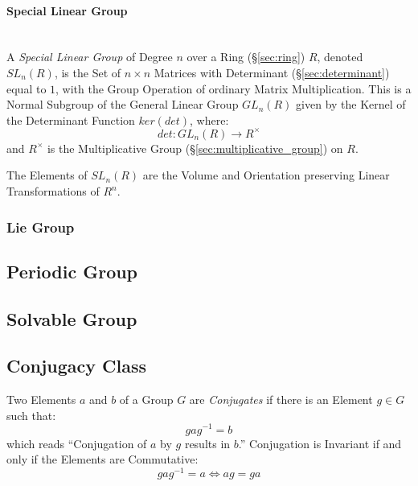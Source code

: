 \paragraph{Special Linear Group}\label{sec:special_linear_group}

\hfill \\ A \emph{Special Linear Group} of Degree $n$ over a Ring
(\S\ref{sec:ring}) $R$, denoted $SL_n(R)$, is the Set of $n \times n$
Matrices with Determinant (\S\ref{sec:determinant}) equal to $1$, with
the Group Operation of ordinary Matrix Multiplication. This is a
Normal Subgroup of the General Linear Group $GL_n(R)$ given by the
Kernel of the Determinant Function $ker(det)$, where:
\[
  det : GL_n(R) \rightarrow R^\times
\]
and $R^\times$ is the Multiplicative Group
(\S\ref{sec:multiplicative_group}) on $R$.

The Elements of $SL_n(R)$ are the Volume and Orientation preserving
Linear Transformations of $R^n$.



\subsubsection{Lie Group}\label{sec:lie_group}



\subsection{Periodic Group}\label{sec:periodic_group}

\subsection{Solvable Group}\label{sec:solvable_group}

\subsection{Conjugacy Class}\label{sec:conjugacy_class}

Two Elements $a$ and $b$ of a Group $G$ are \emph{Conjugates} if there
is an Element $g \in G$ such that:
\[
    gag^{-1} = b
\]
which reads ``Conjugation of $a$ by $g$ results in $b$.'' Conjugation
is Invariant if and only if the Elements are Commutative:
\[
    gag^{-1} = a \Leftrightarrow ag = ga
\]

